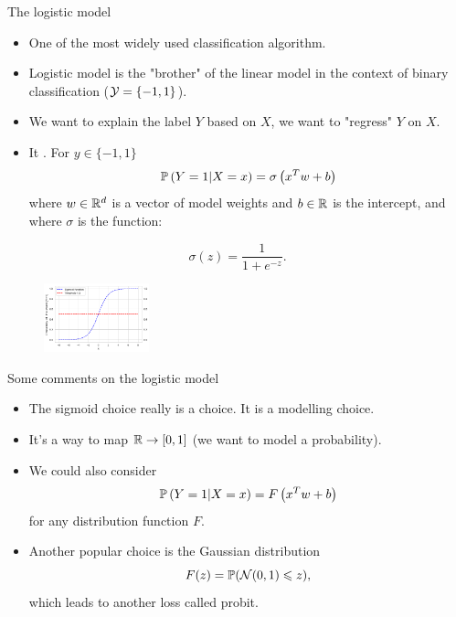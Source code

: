 \documentclass[xcolor={usenames,dvipsnames}]{beamer}
\begin{document}
\begin{frame}{The logistic model}

\begin{itemize}
\item One of the most widely used classification algorithm.

\item Logistic model is the "brother" of the linear model in the context of binary classification 
($\Yc = \{-1, 1\}$).

\item We want to explain the label $Y$ based on $X$, we want to
"regress" $Y$ on $X$.

\item It .
For $y\in \{-1, 1\}$
$$
\P\left(  Y = 1 | X =x \right) = \sigma \left( x^T w +b \right)
$$
where $w\in \R^d$ is a vector of model weights and $b\in\R$ is the
intercept, and where $\sigma$ is the  function:
\end{itemize}
\begin{minipage}{0.45\textwidth}
$$
\sigma(z) = \frac{1}{1+e^{-z}}. 
$$
\end{minipage}
\begin{minipage}{0.35\textwidth}
\begin{figure}[H]
\begin{center}
\includegraphics[height=2cm]{./sigmoid}
\end{center}
\end{figure}
\end{minipage}
\end{frame}



\begin{frame}{Some comments on the logistic model}
\begin{itemize}
\item The sigmoid choice really is a choice. It is a modelling choice.
\item It's a way to map $\R \to [0, 1]$ (we want to model a probability).
\item We could also consider
$$
\P\left(  Y = 1 | X =x \right) = F \left( x^T w +b \right)
$$
for any distribution function $F$. 
\item Another popular choice is the
Gaussian distribution
$$ F(z) = \P(\Nc(0,1) \leq  z),
$$
which leads to another loss called {\color{PineGreen}probit}.
\end{itemize}
\end{frame}
\end{document}
